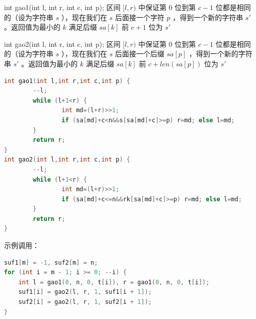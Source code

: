 \documentclass{article}
\begin{document}
int gao1(int l, int r, int c, int p); 区间 $[l, r)$ 中保证第 $0$ 位到第 $c - 1$ 位都是相同的（设为字符串 $s$ ），现在我们在 $s$ 后面接一个字符 $p$ ，得到一个新的字符串 $s'$ 。返回值为最小的 $k$ 满足后缀 $sa[k]$ 前 $c + 1$ 位为 $s'$ 

int gao2(int l, int r, int c, int p); 区间 $[l, r)$ 中保证第 $0$ 位到第 $c - 1$ 位都是相同的（设为字符串 $s$ ），现在我们在 $s$ 后面接一个后缀 $sa[p]$ ，得到一个新的字符串 $s'$ 。返回值为最小的 $k$ 满足后缀 $sa[k]$ 前 $c + len(sa[p])$ 位为 $s'$ 

\begin{lstlisting}[language=C++]
int gao1(int l,int r,int c,int p) {
        --l;
        while (l+1<r) {
                int md=(l+r)>>1;
                if (sa[md]+c<n&&s[sa[md]+c]>=p) r=md; else l=md;
        }
        return r;
}
int gao2(int l,int r,int c,int p) {
        --l;
        while (l+1<r) {
                int md=(l+r)>>1;
                if (sa[md]+c<=n&&rk[sa[md]+c]>=p) r=md; else l=md;
        }
        return r;
}
\end{lstlisting}
示例调用：
\begin{lstlisting}[language=C++]
suf1[m] = -1, suf2[m] = n;
for (int i = m - 1; i >= 0; --i) {
	int l = gao1(0, n, 0, t[i]), r = gao1(0, n, 0, t[i]);
	suf1[i] = gao2(l, r, 1, suf1[i + 1]);
	suf2[i] = gao2(l, r, 1, suf2[i + 1]);
}
\end{lstlisting}
\end{document}
